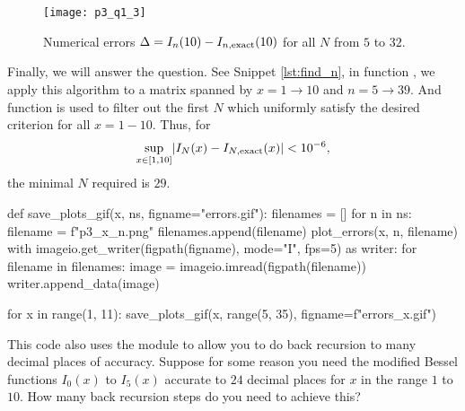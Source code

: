 \begin{figure}
    \centering
    \texttt{[image: p3\_q1\_3]}
    \caption{Numerical errors $\Delta = I_n(10) - I_{n,\textnormal{exact}}(10)$
        for all $N$ from $5$ to $32$.}
    \label{fig:plot_errors_10}
\end{figure}

Finally, we will answer the question. See Snippet \ref{lst:find_n},
in function , we apply this algorithm to a matrix spanned by
$x = 1 \to 10$ and $n = 5 \to 39$.
And function  is used to filter out the first $N$ which uniformly
satisfy the desired criterion for all $x = 1 - 10$.
Thus, for
%
\begin{equation}
    \sup_{x \in [1, 10]} \lvert I_N(x) - I_{N,\textnormal{exact}}(x) \rvert < 10^{-6},
\end{equation}
the minimal $N$ required is $29$.

\begin{algorithm}[H]
    \caption{}
    \label{lst:gif}
    \begin{pythoncode}
        def save_plots_gif(x, ns, figname="errors.gif"):
            filenames = []
            for n in ns:
                filename = f"p3_{x}_{n}.png"
                filenames.append(filename)
                plot_errors(x, n, filename)
            with imageio.get_writer(figpath(figname), mode="I", fps=5) as writer:
                for filename in filenames:
                    image = imageio.imread(figpath(filename))
                    writer.append_data(image)

        for x in range(1, 11):
            save_plots_gif(x, range(5, 35), figname=f"errors_{x}.gif")
        \end{pythoncode}
\end{algorithm}

\Question This code also uses the  module to allow you to do back recursion to many
decimal places of accuracy. Suppose for some reason you need the modified Bessel functions
$I_0(x)$ to $I_5(x)$ accurate to $24$ decimal places for $x$ in the range $1$ to $10$. How
many back recursion steps do you need to achieve this?

